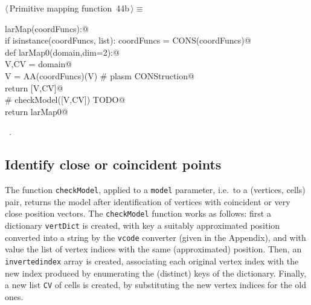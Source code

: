 \documentclass[11pt,oneside]{article}	%
\begin{document}
\begin{flushleft} \small \label{scrap72}
\protect{}$\langle\,$Primitive mapping function\nobreak\ {\footnotesize 44b}$\,\rangle\equiv$
\vspace{-1ex}
\begin{list}{}{} \item
\mbox{}\verb@def larMap(coordFuncs):@\\
\mbox{}\verb@   if isinstance(coordFuncs, list): coordFuncs = CONS(coordFuncs)@\\
\mbox{}\verb@   def larMap0(domain,dim=2):@\\
\mbox{}\verb@      V,CV = domain@\\
\mbox{}\verb@      V = AA(coordFuncs)(V)  # plasm CONStruction@\\
\mbox{}\verb@      return [V,CV]@\\
\mbox{}\verb@      # checkModel([V,CV])  TODO@\\
\mbox{}\verb@   return larMap0@\\
\mbox{}\verb@@{\NWsep}
\end{list}
\vspace{-1ex}
\footnotesize\addtolength{\baselineskip}{-1ex}
\begin{list}{}{\setlength{\itemsep}{-\parsep}\setlength{\itemindent}{-\leftmargin}}
\item \NWtxtMacroRefIn\ .
\end{list}
\end{flushleft}

\subsection{Identify close or coincident points}

The function \texttt{checkModel}, applied to a \texttt{model} parameter, i.e.~to a (vertices, cells)  pair, returns the model after identification of vertices with coincident or very close position vectors.
The \texttt{checkModel} function works as follows: first a dictionary \texttt{vertDict} is created, with key a suitably approximated position converted into a string by the \texttt{vcode} converter (given in the Appendix), and with value the list of vertex indices with the same (approximated) position. Then, an \texttt{invertedindex} array is created, associating each original vertex index with the new index produced by enumerating the (distinct) keys of the dictionary. Finally, a new list \texttt{CV} of cells is created, by substituting the new vertex indices for the old ones. 
\end{document}
